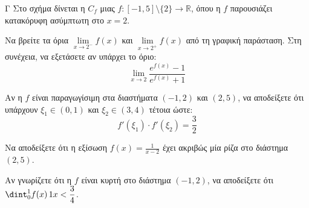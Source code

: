 \begin{thema}{Γ}
Στο σχήμα δίνεται η $C_f$ μιας $f:[-1, 5]\setminus\{2\}\to\mathbb{R}$, όπου η $f$ παρουσιάζει κατακόρυφη ασύμπτωτη στο $x=2$.

\begin{center}
\end{center}

\begin{erwthma}
  \item Να βρείτε τα όρια $\lim\limits_{x \to 2^-} f(x)$ και $\lim\limits_{x \to 2^+} f(x)$ από τη γραφική παράσταση. Στη συνέχεια, να εξετάσετε αν υπάρχει το όριο:
  \[ \lim\limits_{x \to 2} \frac{e^{f(x)} - 1}{e^{f(x)} + 1} \]
  \item Αν η $f$ είναι παραγωγίσιμη στα διαστήματα $(-1, 2)$ και $(2, 5)$, να αποδείξετε ότι υπάρχουν $\xi_1 \in (0, 1)$ και $\xi_2 \in (3, 4)$ τέτοια ώστε:
  \[ f'(\xi_1) \cdot f'(\xi_2) = \frac{3}{2} \]
  \item Να αποδείξετε ότι η εξίσωση $\displaystyle f(x) = \frac{1}{x-2}$ έχει ακριβώς μία ρίζα στο διάστημα $(2, 5)$.
  \item Αν γνωρίζετε ότι η $f$ είναι κυρτή στο διάστημα $(-1, 2)$, να αποδείξετε ότι $\dint_0^1 f(x)\,\d x < \dfrac{3}{4}$.
\end{erwthma}
\end{thema}


